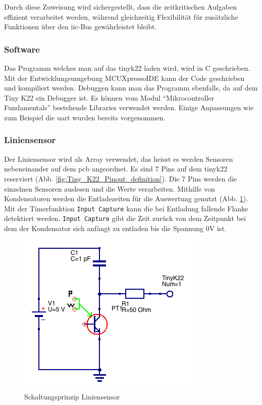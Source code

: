 Durch diese Zuweisung wird sichergestellt, dass die zeitkritischen Aufgaben effizient verarbeitet werden, während gleichzeitig Flexibilität für zusätzliche Funktionen über den \acrshort{iic}-Bus gewährleistet bleibt.

\subsubsection{Software}

Das Programm welches man auf das \acrshort{tinyk22} laden wird, wird in C geschrieben. Mit der Entwicklungsumgebung MCUXpressoIDE kann der Code geschrieben und kompiliert werden. Debuggen kann man das Programm ebenfalls, da auf dem Tiny K22 ein Debugger ist. Es können vom Modul ``Mikrocontroller Fundamentals'' bestehende Libraries verwendet werden. Einige Anpassungen wie zum Beispiel die \acrshort{uart} wurden bereits vorgenommen.

\subsubsection{Liniensensor}

Der Liniensensor wird als Array verwendet, das heisst es werden Sensoren nebeneinander auf dem \acrshort{pcb} angeordnet. Es sind 7 Pins auf dem \acrshort{tinyk22} reserviert (Abb. \ref{fig:Tiny_K22_Pinout_definition}). Die 7 Pins werden die einzelnen Sensoren auslesen und die Werte verarbeiten. Mithilfe von Kondensatoren werden die Entladezeiten für die Auswertung genutzt (Abb. \ref{fig:Liniensensor_Schaltung}). Mit der Timerfunktion \verb|Input Capture| kann die bei Entladung fallende Flanke detektiert werden. \verb|Input Capture| gibt die Zeit zurück von dem Zeitpunkt bei dem der Kondensator sich anfängt zu entladen bis die Spannung 0V ist.

\begin{figure}[H]
    \centering
    \includegraphics[width=0.8\linewidth]{img/Liniensensor_Schaltung.png}
    \caption{Schaltungsprinzip Liniensensor}
    \label{fig:Liniensensor_Schaltung}
\end{figure}

